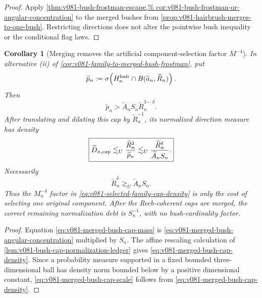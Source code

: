 \documentclass[10pt]{article}
\newtheorem{corollary}[theorem]{Corollary}
\begin{document}
\begin{proof}
Apply \cref{thm:v081-bush-frostman-escape,%
cor:v081-bush-frostman-or-angular-concentration} to the merged bushes from
\cref{prop:v081-hairbrush-merges-to-one-bush}.  Restricting directions does not alter the pointwise
bush inequality or the conditional flag laws.
\end{proof}

\begin{corollary}[Merging removes the artificial component-selection factor \(M^{-4}\)]
\label{cor:v081-merged-bush-cap-debt}
In alternative \textnormal{(ii)} of
\cref{cor:v081-family-to-merged-bush-frostman}, put
\[
\widetilde p_n
:=
\sigma\!\left(
H_n^{\rm hair}\cap B(\widetilde a_n,\widetilde R_n)
\right).
\]
Then
\begin{equation}
\label{eq:v081-merged-bush-cap-mass}
\boxed{
\widetilde p_n
>
\widetilde A_nS_n\widetilde R_n^{3-\delta}.
}
\end{equation}
After translating and dilating this cap by \(\widetilde R_n^{-1}\), its normalized direction
measure has density
\begin{equation}
\label{eq:v081-merged-bush-cap-density}
\boxed{
\widetilde D_{n,\rm cap}
\lesssim_U
\frac{\widetilde R_n^3}{\widetilde p_n}
\lesssim_U
\frac{\widetilde R_n^\delta}{\widetilde A_nS_n}.
}
\end{equation}
Necessarily
\begin{equation}
\label{eq:v081-merged-bush-cap-scale}
\boxed{
\widetilde R_n^\delta
\gtrsim_U
\widetilde A_nS_n.
}
\end{equation}
Thus the \(M_n^{-4}\) factor in
\eqref{eq:v081-selected-family-cap-density} is only the cost of selecting one original component.
After the Reeb-coherent caps are merged, the correct remaining normalization debt is
\(S_n^{-1}\), with no bush-cardinality factor.
\end{corollary}

\begin{proof}
Equation \eqref{eq:v081-merged-bush-cap-mass} is
\eqref{eq:v081-merged-bush-angular-concentration} multiplied by \(S_n\).  The affine rescaling
calculation of \cref{lem:v081-bush-cap-normalization-ledger} gives
\eqref{eq:v081-merged-bush-cap-density}.  Since a probability measure supported in a fixed bounded
three-dimensional ball has density norm bounded below by a positive dimensional constant,
\eqref{eq:v081-merged-bush-cap-scale} follows from
\eqref{eq:v081-merged-bush-cap-density}.
\end{proof}
\end{document}
